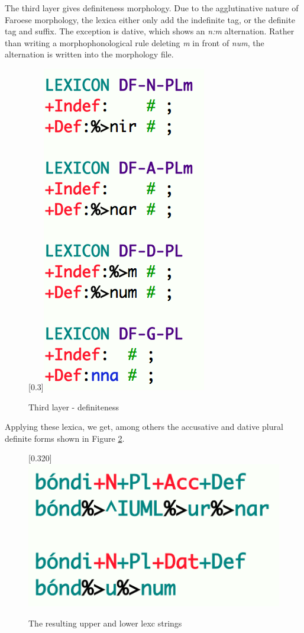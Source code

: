 \documentclass[11pt]{article}
\begin{document}
The third layer gives definiteness morphology. Due to the agglutinative nature of Faroese morphology, the lexica either only add the indefinite tag, or the definite tag and suffix. The exception is dative, which shows an \textit{n:m} alternation. Rather than writing a morphophonological rule deleting \textit{m} in front of \textit{num}, the alternation is written into the morphology file.

\begin{figure}[htp]
\begin{center}
\scalebox{0.3}[0.3]{\includegraphics{img/dfnplm.png}}
\caption{Third layer - definiteness}
\label{dfnplm}
\end{center}
\end{figure}
 

Applying these lexica, we get, among others the accusative and dative plural definite forms shown in Figure \ref{lexcstring}.  

\begin{figure}[htp]
\begin{center}
\scalebox{0.320}[0.320]{\includegraphics{img/bondi_lexc.png}}
\caption{The resulting upper and lower lexc strings}
\label{lexcstring}
\end{center}
\end{figure}
\end{document}
